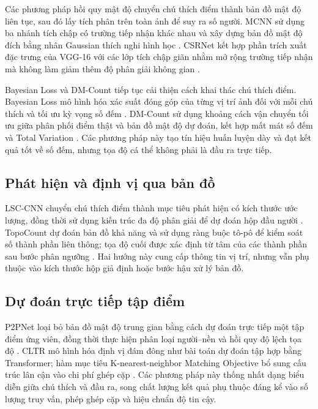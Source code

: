 Các phương pháp hồi quy mật độ chuyển chú thích điểm thành bản đồ mật độ liên tục, sau đó lấy tích phân trên toàn ảnh để suy ra số người. MCNN sử dụng ba nhánh tích chập có trường tiếp nhận khác nhau và xây dựng bản đồ mật độ đích bằng nhân Gaussian thích nghi hình học \cite{zhang2016mcnn}. CSRNet kết hợp phần trích xuất đặc trưng của VGG-16 với các lớp tích chập giãn nhằm mở rộng trường tiếp nhận mà không làm giảm thêm độ phân giải không gian \cite{li2018csrnet}.

Bayesian Loss và DM-Count tiếp tục cải thiện cách khai thác chú thích điểm. Bayesian Loss mô hình hóa xác suất đóng góp của từng vị trí ảnh đối với mỗi chú thích và tối ưu kỳ vọng số đếm \cite{ma2019bayesian}. DM-Count sử dụng khoảng cách vận chuyển tối ưu giữa phân phối điểm thật và bản đồ mật độ dự đoán, kết hợp mất mát số đếm và Total Variation \cite{wang2020dmcount}. Các phương pháp này tạo tín hiệu huấn luyện dày và đạt kết quả tốt về số đếm, nhưng tọa độ cá thể không phải là đầu ra trực tiếp.

\subsection{Phát hiện và định vị qua bản đồ}

LSC-CNN chuyển chú thích điểm thành mục tiêu phát hiện có kích thước ước lượng, đồng thời sử dụng kiến trúc đa độ phân giải để dự đoán hộp đầu người \cite{sam2021lsccnn}. TopoCount dự đoán bản đồ khả năng và sử dụng ràng buộc tô-pô để kiểm soát số thành phần liên thông; tọa độ cuối được xác định từ tâm của các thành phần sau bước phân ngưỡng \cite{abousamra2021topocount}. Hai hướng này cung cấp thông tin vị trí, nhưng vẫn phụ thuộc vào kích thước hộp giả định hoặc bước hậu xử lý bản đồ.

\subsection{Dự đoán trực tiếp tập điểm}

P2PNet loại bỏ bản đồ mật độ trung gian bằng cách dự đoán trực tiếp một tập điểm ứng viên, đồng thời thực hiện phân loại người--nền và hồi quy độ lệch tọa độ \cite{song2021p2pnet}. CLTR mô hình hóa định vị đám đông như bài toán dự đoán tập hợp bằng Transformer; hàm mục tiêu K-nearest-neighbor Matching Objective bổ sung cấu trúc lân cận vào chi phí ghép cặp \cite{liang2022cltr}. Các phương pháp này thống nhất dạng biểu diễn giữa chú thích và đầu ra, song chất lượng kết quả phụ thuộc đáng kể vào số lượng truy vấn, phép ghép cặp và hiệu chuẩn độ tin cậy.

